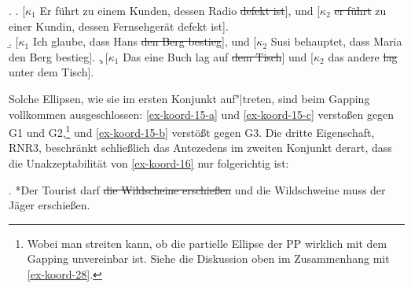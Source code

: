 \ex. \label{ex-koord-15} 
\a. \label{ex-koord-15-a}[$\kappa_1$ Er führt zu einem Kunden, dessen Radio \sout{defekt ist}], und [$\kappa_2$ \sout{er führt} zu einer Kundin, dessen Fernsehgerät defekt ist]. \\ \citep[(3-101)]{Hesse:Kuestner:85}
\b. \label{ex-koord-15-b}[$\kappa_1$ Ich glaube, dass Hans \sout{den Berg bestieg}], und [$\kappa_2$ Susi behauptet, dass Maria den Berg bestieg].  
\c. \label{ex-koord-15-c}[$\kappa_1$ Das eine Buch lag auf \sout{dem Tisch}] und [$\kappa_2$ das andere \sout{lag} unter dem Tisch]. 	\hfill \citep[150]{Lobin:93}

Solche Ellipsen, wie sie im ersten Konjunkt auf"|treten, sind beim Gapping vollkommen ausgeschlossen: \ref{ex-koord-15-a} und \ref{ex-koord-15-c} versto\ss en gegen G1 und G2,\footnote{Wobei man streiten kann, ob die partielle Ellipse der PP wirklich mit dem Gapping unvereinbar ist. Siehe die Diskussion oben im Zusammenhang mit \ref{ex-koord-28}.} und \ref{ex-koord-15-b} verstö\ss t gegen G3.  Die dritte Eigenschaft, RNR3, beschränkt schlie\ss lich das Antezedens im zweiten Konjunkt derart, dass die Unakzeptabilität von \ref{ex-koord-16} nur folgerichtig ist:

\ex. *Der Tourist darf \sout{die Wildscheine erschie\ss en} und die Wildschweine muss der J\"ager erschie\ss en.\label{ex-koord-16} 

